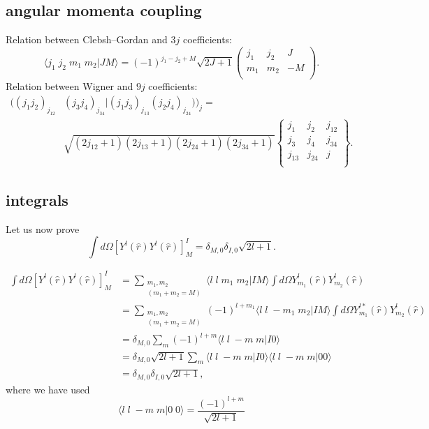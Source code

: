 \begin{subappendices}
\subsection{angular momenta coupling}
Relation between Clebsh--Gordan and $3j$ coefficients:
\begin{equation}\label{eq204}
\langle j_1\; j_2 \; m_1\;m_2 | J M\rangle=(-1)^{j_1-j_2+M}\sqrt{2J+1}\begin{pmatrix}
  j_1&j_2&J\\
 m_1&m_2&-M\\
\end{pmatrix}.
\end{equation}
Relation between Wigner and $9j$ coefficients:
\begin{equation}\label{eq205}
\begin{split}
\bigl ( (j_1j_2)_{j_{12}}& (j_3j_4)_{j_{34}} |(j_1j_3)_{j_{13}} (j_2j_4)_{j_{24}}) \bigr )_j=\\
&\sqrt{(2j_{12}+1)(2j_{13}+1)(2j_{24}+1)(2j_{34}+1)}\begin{Bmatrix}
  j_1&j_2&j_{12}\\
 j_3&j_4&j_{34}\\
 j_{13}&j_{24}&j\\
\end{Bmatrix}.
\end{split}
\end{equation}
\subsection{integrals}
Let us now prove
\begin{equation}\label{eq14}
\int d\Omega \left[ Y^{l}(\hat r)Y^{l}(\hat r) \right]^{I}_{M}=\delta_{M,0}\delta_{I,0}\sqrt{2l+1}.
\end{equation}

\begin{equation}\label{eq15}
\begin{split}
\int d\Omega \left[ Y^{l}(\hat r)Y^{l}(\hat r) \right]^{I}_{M}&= \sum_{\substack{m_1,m_2\\(m_1+m_2=M)}}
\langle l\; l \; m_1\;m_2 | I M\rangle \int d\Omega  Y_{m_1}^{l}(\hat r)Y_{m_2}^{l}(\hat r)\\
&=\sum_{\substack{m_1,m_2\\(m_1+m_2=M)}} (-1)^{l+m_1} \langle l\; l \; -m_1\;m_2 | I M\rangle
\int d\Omega  Y_{m_1}^{l*}(\hat r)Y_{m_2}^{l}(\hat r)\\
&= \delta_{M,0}\sum_m (-1)^{l+m} \langle l\; l \; -m\;m | I 0\rangle \\
&= \delta_{M,0}\sqrt{2l+1}\sum_m  \langle l\; l \; -m\;m | I 0\rangle \langle l\; l \; -m\;m | 0 0\rangle \\
&= \delta_{M,0}\delta_{I,0}\sqrt{2l+1},
\end{split}
\end{equation}
where we have used
\begin{equation}\label{eq22}
\langle l \;l \; -m \;m | 0\; 0 \rangle=\frac{(-1)^{l+m}}{\sqrt{2l+1}}
\end{equation}


\end{subappendices}
